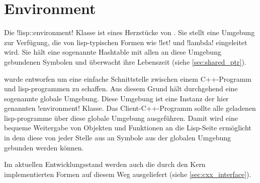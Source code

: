 \section{Environment}
\label{sec:environment}

Die !lisp::environment! Klasse ist eines Herzstücke von \projectname{}.
Sie stellt eine Umgebung zur Verfügung, die von lisp-typischen Formen wie !let! und !lambda!
eingeleitet wird. Sie hält eine sogenannte Hashtable mit allen an diese Umgebung gebundenen
Symbolen und überwacht ihre Lebenszeit (siehe \ref{sec:shared_ptr}).

\projectname{} wurde entworfen um eine einfache Schnittstelle zwischen einem C++-Programm
und lisp-programmen zu schaffen. Aus diesem Grund hält \projectname{} durchgehend
eine sogenannte globale Umgebung. Diese Umgebung ist eine Instanz der hier genannten 
!environment! Klasse. Das Client-C++-Programm sollte alle geladenen lisp-programme
über diese globale Umgebung ausgeführen. Damit wird eine bequeme Weitergabe von Objekten
und Funktionen an die Lisp-Seite ermöglicht in dem diese von jeder Stelle aus an Symbole
aus der globalen Umgebung gebunden werden können.

Im aktuellen Entwicklungsstand werden auch die durch den Kern implementierten
Formen auf diesem Weg ausgeliefert (siehe \ref{sec:cxx_interface}).
